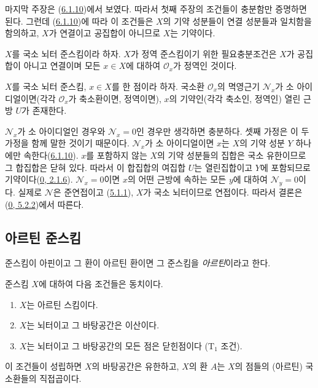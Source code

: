 마지막 주장은 (\hyperref[I.6.1.10-ko]{6.1.10})에서 보였다. 따라서
첫째 주장의 조건들이 충분함만 증명하면 된다. 그런데
(\hyperref[I.6.1.10-ko]{6.1.10})에 따라 이 조건들은 $X$의 기약
성분들이 연결 성분들과 일치함을 함의하고, $X$가 연결이고 공집합이
아니므로 $X$는 기약이다.

\begin{corollary}[6.1.12]
\label{I.6.1.12-ko}
$X$를 국소 뇌터 준스킴이라 하자. $X$가 정역 준스킴이기 위한
필요충분조건은 $X$가 공집합이 아니고 연결이며 모든 $x\in X$에 대하여
$\mathscr{O}_x$가 정역인 것이다.
\end{corollary}

\begin{proposition}[6.1.13]
\label{I.6.1.13-ko}
$X$를 국소 뇌터 준스킴, $x\in X$를 한 점이라 하자. 국소환
$\mathscr{O}_x$의 멱영근기 $\mathscr{N}_x$가 소 아이디얼이면(각각
$\mathscr{O}_x$가 축소환이면, 정역이면), $x$의 기약인(각각 축소인,
정역인) 열린 근방 $U$가 존재한다.
\end{proposition}

$\mathscr{N}_x$가 소 아이디얼인 경우와 $\mathscr{N}_x=0$인 경우만
생각하면 충분하다. 셋째 가정은 이 두 가정을 함께 말한 것이기
때문이다. $\mathscr{N}_x$가 소 아이디얼이면 $x$는 $X$의 기약 성분
$Y$ 하나에만 속한다(\hyperref[I.6.1.10-ko]{6.1.10}). $x$를 포함하지
않는 $X$의 기약 성분들의 집합은 국소 유한이므로 그 합집합은 닫혀
있다. 따라서 이 합집합의 여집합 $U$는 열린집합이고 $Y$에 포함되므로
기약이다(\hyperref[0.2.1.6-ko]{0, 2.1.6}). $\mathscr{N}_x=0$이면
$x$의 어떤 근방에 속하는 모든 $y$에 대하여 $\mathscr{N}_y=0$이다.
실제로 $\mathscr{N}$은 준연접이고
(\hyperref[I.5.1.1-ko]{5.1.1}), $X$가 국소 뇌터이므로 연접이다.
따라서 결론은 (\hyperref[0.5.2.2-ko]{0, 5.2.2})에서 따른다.

\subsection{아르틴 준스킴}
\label{subsection:I.6.2-ko}

\begin{definition}[6.2.1]
\label{I.6.2.1-ko}
준스킴이 아핀이고 그 환이 아르틴 환이면 그 준스킴을
\emph{아르틴}이라고 한다.
\end{definition}

\begin{proposition}[6.2.2]
\label{I.6.2.2-ko}
준스킴 $X$에 대하여 다음 조건들은 동치이다.
\begin{enumerate}
  \item[a)] $X$는 아르틴 스킴이다.
  \item[b)] $X$는 뇌터이고 그 바탕공간은 이산이다.
  \item[c)] $X$는 뇌터이고 그 바탕공간의 모든 점은 닫힌점이다
    ($\mathrm{T}_1$ 조건).
\end{enumerate}

이 조건들이 성립하면 $X$의 바탕공간은 유한하고, $X$의 환 $A$는
$X$의 점들의 (아르틴) 국소환들의 직접곱이다.
\end{proposition}

